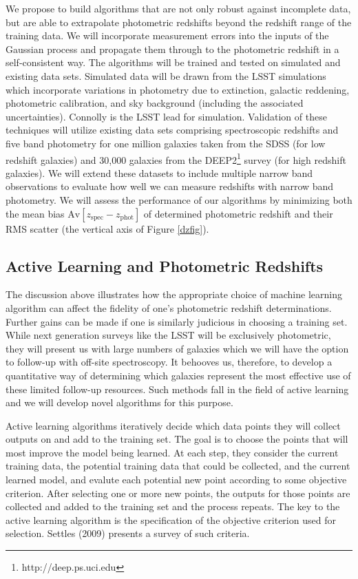 \documentclass[prd, nofootinbib, floatfix, 12pt,tightenlines]{revtex4}
\begin{document}
We propose to build algorithms that are not only robust against incomplete
data, but are able to extrapolate photometric redshifts beyond the redshift
range of the training data.  We will incorporate measurement errors into
the inputs of the Gaussian process and propagate them through to the
photometric redshift in a self-consistent way.  The algorithms will be
trained and tested on simulated and existing data sets.  Simulated data
will be drawn from the LSST simulations which incorporate variations in
photometry due to extinction, galactic reddening, photometric calibration,
and sky background (including the associated uncertainties).  Connolly is
the LSST lead for simulation.  Validation of these techniques will utilize
existing data sets comprising spectroscopic redshifts and five band
photometry for one million galaxies taken from the SDSS (for low redshift
galaxies) and 30,000 galaxies from the
DEEP2\footnote{http://deep.ps.uci.edu} survey (for high redshift galaxies).
We will extend these datasets to include multiple narrow band observations
to evaluate how well we can measure redshifts with narrow band photometry.
We will assess the performance of our algorithms by minimizing both the
mean bias $\text{Av}[z_\text{spec}-z_\text{phot}]$ of determined photometric
redshift and their RMS scatter (the vertical axis of Figure \ref{dzfig}).

\subsection{Active Learning and Photometric Redshifts}
\label{sec:mlpz}

The discussion above illustrates how the appropriate choice of machine
learning algorithm can affect the fidelity of one's photometric redshift
determinations.  Further gains can be made if one is similarly judicious in
choosing a training set.  While next generation surveys like the LSST will
be exclusively photometric, they will present us with large numbers of
galaxies which we will have the option to follow-up with off-site
spectroscopy.  It behooves us, therefore, to develop a quantitative way of
determining which galaxies represent the most effective use of these
limited follow-up resources.  Such methods fall in the field of active
learning and we will develop novel algorithms for this purpose.

Active learning algorithms iteratively decide which data points they will
collect outputs on and add to the training set.  The goal is to choose the
points that will most improve the model being learned.  At each step, they
consider the current training data, the potential training data that could
be collected, and the current learned model, and evalute each potential new
point according to some objective criterion.  After selecting one or more
new points, the outputs for those points are collected and added to the
training set and the process repeats.  The key to the active learning
algorithm is the specification of the objective criterion used for
selection.  Settles (2009) presents a survey of such criteria.
\end{document}
